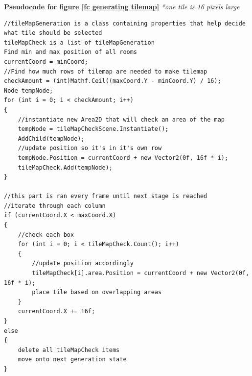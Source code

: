 \documentclass{article}
\begin{document}
\textbf{Pseudocode for figure \ref{fc generating tilemap}} \linebreak
\textit{*one tile is 16 pixels large}
\begin{lstlisting}
//tileMapGeneration is a class containing properties that help decide what tile should be selected
tileMapCheck is a list of tileMapGeneration
Find min and max position of all rooms
currentCoord = minCoord;
//Find how much rows of tilemap are needed to make tilemap
checkAmount = (int)Mathf.Ceil((maxCoord.Y - minCoord.Y) / 16);
Node tempNode;
for (int i = 0; i < checkAmount; i++)
{
	//instantiate new Area2D that will check an area of the map
    tempNode = tileMapCheckScene.Instantiate();
    AddChild(tempNode);
    //update position so it's in it's own row
    tempNode.Position = currentCoord + new Vector2(0f, 16f * i);
    tileMapCheck.Add(tempNode);
}

//this part is ran every frame until next stage is reached
//iterate through each column
if (currentCoord.X < maxCoord.X)
{
    //check each box
    for (int i = 0; i < tileMapCheck.Count(); i++)
    {
        //update position accordingly
        tileMapCheck[i].area.Position = currentCoord + new Vector2(0f, 16f * i);
        place tile based on overlapping areas 
    }
    currentCoord.X += 16f;
}
else
{
    delete all tileMapCheck items
    move onto next generation state
}
\end{lstlisting}
\end{document}
